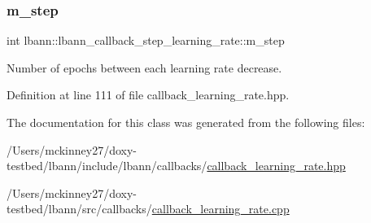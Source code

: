 \subsubsection{\texorpdfstring{m\+\_\+step}{m\_step}}
{\footnotesize\ttfamily int lbann\+::lbann\+\_\+callback\+\_\+step\+\_\+learning\+\_\+rate\+::m\+\_\+step\hspace{0.3cm}{\ttfamily [private]}}

Number of epochs between each learning rate decrease. 

Definition at line 111 of file callback\+\_\+learning\+\_\+rate.\+hpp.



The documentation for this class was generated from the following files\+:\begin{DoxyCompactItemize}
\item 
/\+Users/mckinney27/doxy-\/testbed/lbann/include/lbann/callbacks/\hyperlink{callback__learning__rate_8hpp}{callback\+\_\+learning\+\_\+rate.\+hpp}\item 
/\+Users/mckinney27/doxy-\/testbed/lbann/src/callbacks/\hyperlink{callback__learning__rate_8cpp}{callback\+\_\+learning\+\_\+rate.\+cpp}\end{DoxyCompactItemize}
